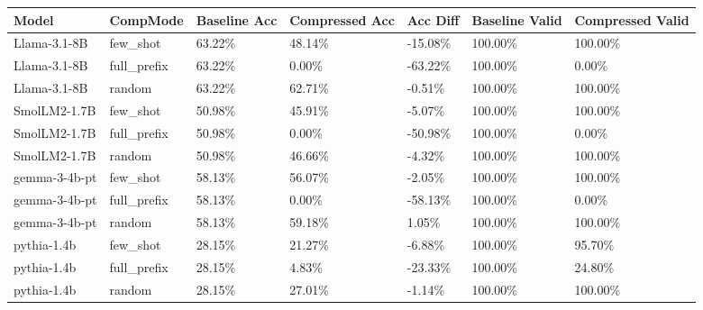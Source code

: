 \begin{tabular}{lllllll}
\toprule
\textbf{Model} & \textbf{CompMode} & \textbf{Baseline Acc} & \textbf{Compressed Acc} & \textbf{Acc Diff} & \textbf{Baseline Valid} & \textbf{Compressed Valid} \\
\midrule
Llama-3.1-8B  & few\_shot    & 63.22\% & 48.14\% & -15.08\% & 100.00\% & 100.00\% \\
Llama-3.1-8B  & full\_prefix & 63.22\% & 0.00\%  & -63.22\% & 100.00\% & 0.00\%   \\
Llama-3.1-8B  & random       & 63.22\% & 62.71\% & -0.51\%  & 100.00\% & 100.00\% \\
\midrule
SmolLM2-1.7B  & few\_shot    & 50.98\% & 45.91\% & -5.07\%  & 100.00\% & 100.00\% \\
SmolLM2-1.7B  & full\_prefix & 50.98\% & 0.00\%  & -50.98\% & 100.00\% & 0.00\%   \\
SmolLM2-1.7B  & random       & 50.98\% & 46.66\% & -4.32\%  & 100.00\% & 100.00\% \\
\midrule
gemma-3-4b-pt & few\_shot    & 58.13\% & 56.07\% & -2.05\%  & 100.00\% & 100.00\% \\
gemma-3-4b-pt & full\_prefix & 58.13\% & 0.00\%  & -58.13\% & 100.00\% & 0.00\%   \\
gemma-3-4b-pt & random       & 58.13\% & 59.18\% & 1.05\%   & 100.00\% & 100.00\% \\
\midrule
pythia-1.4b   & few\_shot    & 28.15\% & 21.27\% & -6.88\%  & 100.00\% & 95.70\%  \\
pythia-1.4b   & full\_prefix & 28.15\% & 4.83\%  & -23.33\% & 100.00\% & 24.80\%  \\
pythia-1.4b   & random       & 28.15\% & 27.01\% & -1.14\%  & 100.00\% & 100.00\% \\
\bottomrule
\end{tabular}
